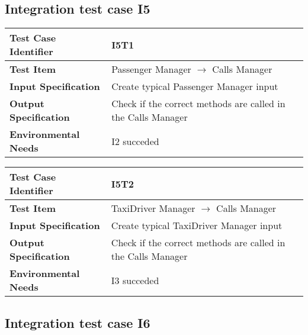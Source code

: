 \subsection{Integration test case I5}

\begin{table}[!htbp]
\begin{center}
\begin{tabular}[t]{p{}p{}}

\hline
\textbf{Test Case Identifier} & I5T1 \\
\hline
\textbf{Test Item} & Passenger Manager $\rightarrow$ Calls Manager \\
\hline
\textbf{Input Specification} & Create typical Passenger Manager input \\
\hline
\textbf{Output Specification} & Check if the correct methods are called in the Calls Manager \\
\hline
\textbf{Environmental Needs} & I2 succeded \\
\hline

\end{tabular}
\end{center}
\end{table}

\begin{table}[!htbp]
\begin{center}
\begin{tabular}[t]{p{}p{}}

\hline
\textbf{Test Case Identifier} & I5T2 \\
\hline
\textbf{Test Item} & TaxiDriver Manager $\rightarrow$ Calls Manager \\
\hline
\textbf{Input Specification} & Create typical TaxiDriver Manager input \\
\hline
\textbf{Output Specification} & Check if the correct methods are called in the Calls Manager \\
\hline
\textbf{Environmental Needs} & I3 succeded \\
\hline

\end{tabular}
\end{center}
\end{table}

\subsection{Integration test case I6}

